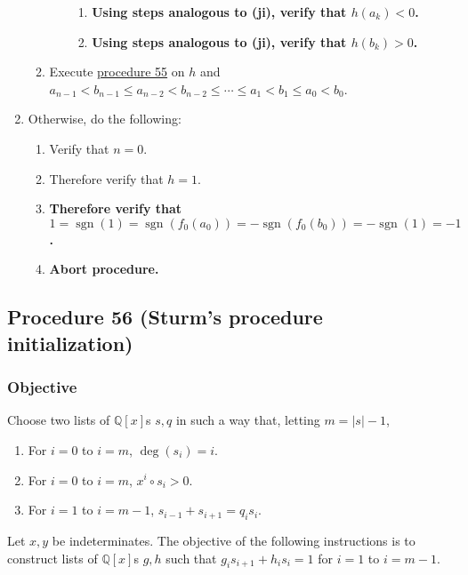 \documentclass[twocolumn]{article}
\DeclareMathOperator{\sgn}{sgn}
\begin{document}
\begin{enumerate}
\begin{enumerate}
\begin{enumerate}
							\begin{enumerate}
								\item \textbf{Using steps analogous to (ji), verify that $h(a_k)<0$.}
								\item \textbf{Using steps analogous to (ji), verify that $h(b_k)>0$.}
							\end{enumerate}
						\end{enumerate}
						\item Execute \hyperref[sec:procedure 55]{procedure 55} on $h$ and $a_{n-1}<b_{n-1}\le a_{n-2}<b_{n-2}\le\cdots\le a_1<b_1\le a_0<b_0$.
					\end{enumerate}
					\item Otherwise, do the following:
					\begin{enumerate}
						\item Verify that $n=0$.
						\item Therefore verify that $h=1$.
						\item \textbf{Therefore verify that $1=\sgn(1)=\sgn(f_0(a_0))=-\sgn(f_0(b_0))=-\sgn(1)=-1$.}
						\item \textbf{Abort procedure.}
					\end{enumerate}
				\end{enumerate}
		\subsection{Procedure 56 (Sturm's procedure initialization)}\label{sec:procedure 56}
			\subsubsection{Objective}
				Choose two lists of $\mathbb{Q}[x]$s $s,q$ in such a way that, letting $m=\lvert s\rvert-1$,
				\begin{enumerate}
					\item For $i=0$ to $i=m$, $\deg(s_i)=i$.
					\item For $i=0$ to $i=m$, $x^i\circ s_i>0$.
					\item For $i=1$ to $i=m-1$, $s_{i-1}+s_{i+1}=q_is_i$.
				\end{enumerate}
				Let $x,y$ be indeterminates. The objective of the following instructions is to construct lists of $\mathbb{Q}[x]$s $g,h$ such that $g_is_{i+1}+h_is_i=1$ for $i=1$ to $i=m-1$.
\end{document}
